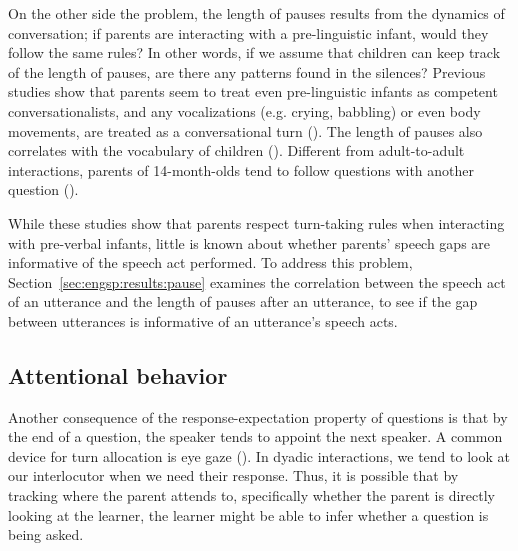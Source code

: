 
On the other side the problem, the length of pauses results from the dynamics of conversation; if parents are interacting with a pre-linguistic infant, would they follow the same rules? In other words, if we assume that children can keep track of the length of pauses, are there any patterns found in the silences? Previous studies show that parents seem to treat even pre-linguistic infants as competent conversationalists, and any vocalizations (e.g. crying, babbling) or even body movements, are treated as a conversational turn (\cite{beebe1988,jaffe2001turn}). The length of pauses also correlates with the vocabulary of children (\cite{marklund2015pause}). Different from adult-to-adult interactions, parents of 14-month-olds tend to follow questions with another question (\cite{reimchen2017}).  

While these studies show that parents respect turn-taking rules when interacting with pre-verbal infants, little is known about whether parents' speech gaps are informative of the speech act performed. To address this problem, Section~\ref{sec:engsp:results:pause} examines the correlation between the speech act of an utterance and the length of pauses after an utterance, to see if the gap between utterances is informative of an utterance's speech acts. 

\subsection{Attentional behavior}
\label{sec:engsp:bg:gaze}

Another consequence of the response-expectation property of questions is that by the end of a question, the speaker tends to appoint the next speaker. A common device for turn allocation is eye gaze (\citealt{argyle1972gaze, kendon1967gaze,duncan1979gaze, rossano2009gaze, csibra2010}). In dyadic interactions, we tend to look at our interlocutor when we need their response. Thus, it is possible that by tracking where the parent attends to, specifically whether the parent is directly looking at the learner, the learner might be able to infer whether a question is being asked. 

